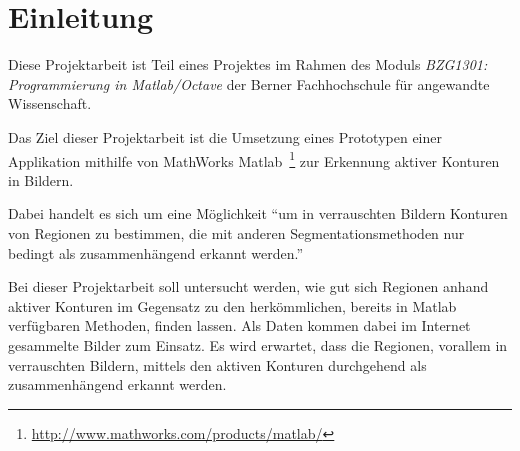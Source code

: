 \chapter{Einleitung}
\label{chap:intro}

Diese Projektarbeit ist Teil eines Projektes im Rahmen des Moduls \textit{BZG1301: Programmierung in Matlab/Octave} der Berner Fachhochschule für angewandte Wissenschaft.

Das Ziel dieser Projektarbeit ist die Umsetzung eines Prototypen einer Applikation mithilfe von MathWorks Matlab~\footnote{\url{http://www.mathworks.com/products/matlab/}} zur Erkennung \gls{aktiver Konturen} in Bildern.

Dabei handelt es sich um eine Möglichkeit ``um in verrauschten Bildern Konturen von Regionen zu bestimmen, die mit anderen \gls{Segmentationsmethoden} nur bedingt als zusammenhängend erkannt werden.''~\cite[S. 144]{hudritsch:script:cp}

Bei dieser Projektarbeit soll untersucht werden, wie gut sich Regionen anhand aktiver Konturen im Gegensatz zu den herkömmlichen, bereits in Matlab verfügbaren Methoden, finden lassen. Als Daten kommen dabei im Internet gesammelte Bilder zum Einsatz. Es wird erwartet, dass die Regionen, vorallem in verrauschten Bildern, mittels den aktiven Konturen durchgehend als zusammenhängend erkannt werden.

%  
